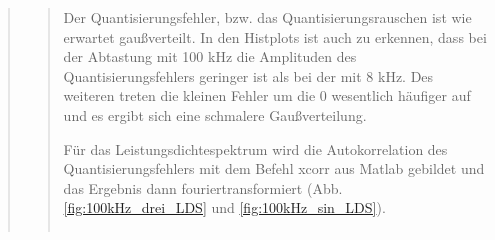 \begin{quote}
\begin{quote}
        Der Quantisierungsfehler, bzw. das Quantisierungsrauschen ist wie erwartet gaußverteilt.
        In den Histplots ist auch zu erkennen, dass bei der Abtastung mit 100 kHz die Amplituden des
        Quantisierungsfehlers geringer ist als bei der mit 8 kHz. Des weiteren treten die kleinen Fehler um die 0
        wesentlich häufiger auf und es ergibt sich eine schmalere Gaußverteilung.
         
        \vspace{2em}
        
        Für das Leistungsdichtespektrum wird die Autokorrelation des Quantisierungsfehlers mit dem Befehl xcorr aus
        Matlab gebildet und das Ergebnis dann fouriertransformiert (Abb. \ref{fig:100kHz_drei_LDS} und
        \ref{fig:100kHz_sin_LDS}).
        
        \begin{center}
            \begin{tabular}{ll}
            

\end{tabular}
\end{center}
\end{quote}
\end{quote}
